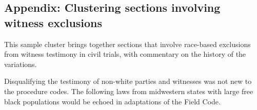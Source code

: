 \documentclass[12pt,]{article}
\begin{document}
\hypertarget{appendix-clustering-sections-involving-witness-exclusions}{%
\subsection{Appendix: Clustering sections involving witness
exclusions}\label{appendix-clustering-sections-involving-witness-exclusions}}

This sample cluster brings together sections that involve race-based
exclusions from witness testimony in civil trials, with commentary on
the history of the variations.

Disqualifying the testimony of non-white parties and witnesses was not
new to the procedure codes. The following laws from midwestern states
with large free black populations would be echoed in adaptations of the
Field Code.
\end{document}
